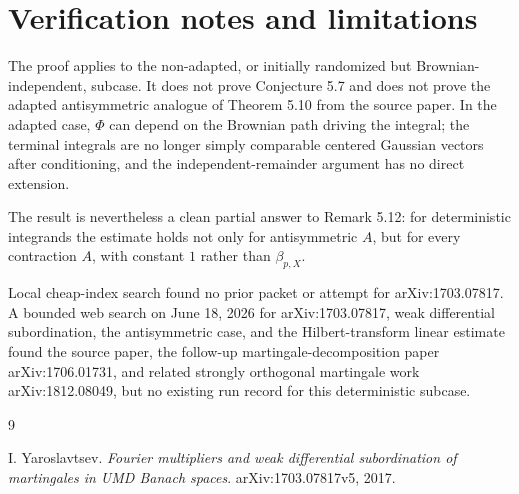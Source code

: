 \documentclass[11pt]{article}
\begin{document}
\section*{Verification notes and limitations}

The proof applies to the non-adapted, or initially randomized but
Brownian-independent, subcase.  It does not prove Conjecture 5.7 and does not
prove the adapted antisymmetric analogue of Theorem 5.10 from the source
paper.  In the adapted case, \(\Phi\) can depend on the Brownian path driving
the integral; the terminal integrals are no longer simply comparable centered
Gaussian vectors after conditioning, and the independent-remainder argument
has no direct extension.

The result is nevertheless a clean partial answer to Remark 5.12: for
deterministic integrands the estimate holds not only for antisymmetric \(A\),
but for every contraction \(A\), with constant \(1\) rather than
\(\beta_{p,X}\).

Local cheap-index search found no prior packet or attempt for arXiv:1703.07817.
A bounded web search on June 18, 2026 for arXiv:1703.07817, weak differential
subordination, the antisymmetric case, and the Hilbert-transform linear
estimate found the source paper, the follow-up martingale-decomposition paper
arXiv:1706.01731, and related strongly orthogonal martingale work
arXiv:1812.08049, but no existing run record for this deterministic subcase.

\begin{thebibliography}{9}

I. Yaroslavtsev.
\newblock \emph{Fourier multipliers and weak differential subordination of
martingales in UMD Banach spaces}.
\newblock arXiv:1703.07817v5, 2017.

\end{thebibliography}
\end{document}
